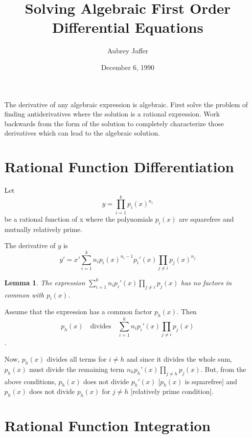 \def\({\left(}
\def\){\right)}
\title{Solving Algebraic First Order Differential Equations}
\author{Aubrey Jaffer}
\date{December 6, 1990}    %


\maketitle                 %
\newtheorem{lemma}{Lemma}

The derivative of any algebraic expression is algebraic.  First solve
the problem of finding antiderivatives where the solution is a
rational expression.  Work backwards from the form of the solution to
completely characterize those derivatives which can lead to the
algebraic solution.

\section{Rational Function Differentiation}

Let $$y=\prod_{i=1}^k p_i(x)^{n_i} \label{product}$$ be a rational
function of x where the polynomials $p_i(x)$ are squarefree and
mutually relatively prime.

The derivative of $y$ is
\begin{equation}
{y'} = {x'} \sum_{i=1}^k n_i p_i(x)^{n_i-1} {p_i'}(x)
\prod_{j \neq i} p_j(x)^{n_j}\label{product'}
\end{equation}

\begin{lemma}
\label{comfact}
The expression $\sum_{i=1}^k n_i {p_i'}(x) \prod_{j \neq i} p_j(x)$
has no factors in common with $p_i(x)$.
\end{lemma}
Assume that the expression has a common factor $p_h(x)$. Then
$$p_h(x) \quad\mbox{divides}\quad
\sum_{i=1}^k n_i {p_i'}(x) \prod_{j \neq i} p_j(x)$$.

Now, $p_h(x)$ divides all terms for $i \neq h$ and since it divides
the whole sum, $p_h(x)$ must divide the remaining term $n_h p_h'(x)
\prod_{j \neq h} p_j(x)$.  But, from the above conditions, $p_h(x)$
does not divide $p_h'(x)$ [$p_h(x)$ is squarefree] and $p_h(x)$ does
not divide $p_h(x)$ for $j \neq h$ [relatively prime condition].

\section{Rational Function Integration}

